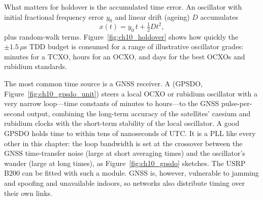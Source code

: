 

What matters for holdover is the accumulated time error. An oscillator with initial fractional
frequency error $y_0$ and linear drift (ageing) $D$ accumulates
\begin{equation}
x(t)=y_0\,t+\tfrac12Dt^2,
\end{equation}
plus random-walk terms. Figure~\ref{fig:ch10_holdover} shows how quickly the $\pm1.5\,\mu$s TDD budget
is consumed for a range of illustrative oscillator grades: minutes for a TCXO, hours for an OCXO, and days
for the best OCXOs and rubidium standards.



The most common time source is a GNSS receiver. A  (GPSDO,
Figure~\ref{fig:ch10_gpsdo_unit}) steers a local OCXO or rubidium oscillator with a very narrow
loop---time constants of minutes to hours---to the GNSS pulse-per-second output, combining the
long-term accuracy of the satellites' caesium and rubidium clocks with the short-term stability of
the local oscillator. A good GPSDO holds time to within tens of nanoseconds of UTC. It is a PLL like
every other in this chapter: the loop bandwidth is set at the crossover between the GNSS
time-transfer noise (large at short averaging times) and the oscillator's wander (large at long
times), as Figure~\ref{fig:ch10_gpsdo} sketches. The USRP B200 can be fitted with such a module.
GNSS is, however, vulnerable to jamming and spoofing and unavailable indoors, so networks also
distribute timing over their own links.

